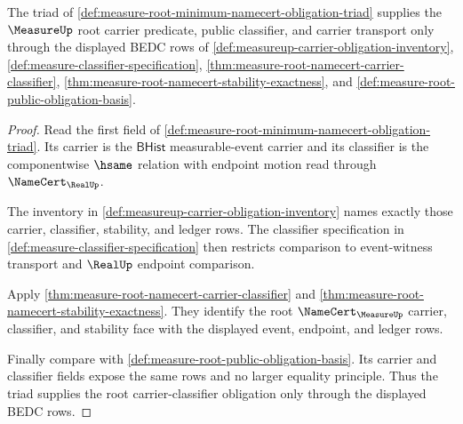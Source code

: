 \begin{theorem}
\label{thm:measure-root-minimum-carrier-classifier-obligation}
The triad of
\autoref{def:measure-root-minimum-namecert-obligation-triad} supplies the
$\MeasureUp$ root carrier predicate, public classifier, and carrier transport
only through the displayed BEDC rows of
\autoref{def:measureup-carrier-obligation-inventory},
\autoref{def:measure-classifier-specification},
\autoref{thm:measure-root-namecert-carrier-classifier},
\autoref{thm:measure-root-namecert-stability-exactness}, and
\autoref{def:measure-root-public-obligation-basis}.
\end{theorem}
\begin{proof}
Read the first field of
\autoref{def:measure-root-minimum-namecert-obligation-triad}. Its carrier is
the $\mathsf{BHist}$ measurable-event carrier and its classifier is the
componentwise $\hsame$ relation with endpoint motion read through
$\NameCert_{\RealUp}$.

The inventory in \autoref{def:measureup-carrier-obligation-inventory} names
exactly those carrier, classifier, stability, and ledger rows. The classifier
specification in \autoref{def:measure-classifier-specification} then restricts
comparison to event-witness transport and $\RealUp$ endpoint comparison.

Apply \autoref{thm:measure-root-namecert-carrier-classifier} and
\autoref{thm:measure-root-namecert-stability-exactness}. They identify the
root $\NameCert_{\MeasureUp}$ carrier, classifier, and stability face with the
displayed event, endpoint, and ledger rows.

Finally compare with
\autoref{def:measure-root-public-obligation-basis}. Its carrier and
classifier fields expose the same rows and no larger equality principle.
Thus the triad supplies the root carrier-classifier obligation only through
the displayed BEDC rows.
\end{proof}

